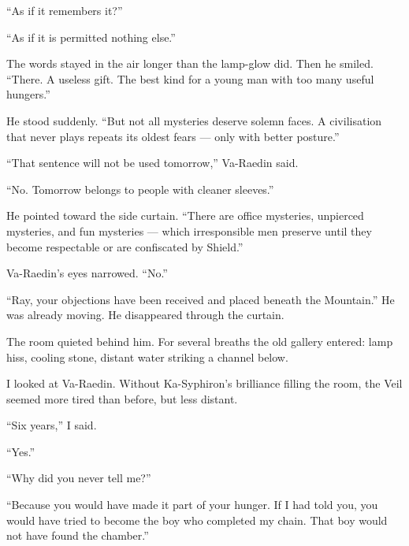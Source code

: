 ``As if it remembers it?''\par

``As if it is permitted nothing else.''\par

The words stayed in the air longer than the lamp-glow did. Then he smiled.
``There. A useless gift. The best kind for a young man with too many useful hungers.''\par

He stood suddenly. ``But not all mysteries deserve solemn faces. A civilisation that never plays repeats its oldest fears --- only with better posture.''\par

``That sentence will not be used tomorrow,'' Va-Raedin said.\par

``No. Tomorrow belongs to people with cleaner sleeves.''\par

He pointed toward the side curtain. ``There are office mysteries, unpierced mysteries, and fun mysteries --- which irresponsible men preserve until they become respectable or are confiscated by Shield.''\par

Va-Raedin's eyes narrowed. ``No.''\par

``Ray, your objections have been received and placed beneath the Mountain.'' He was already moving. He disappeared through the curtain.\par

The room quieted behind him. For several breaths the old gallery entered: lamp hiss, cooling stone, distant water striking a channel below.\par

I looked at Va-Raedin. Without Ka-Syphiron's brilliance filling the room, the Veil seemed more tired than before, but less distant.\par

``Six years,'' I said.\par

``Yes.''\par

``Why did you never tell me?''\par

``Because you would have made it part of your hunger. If I had told you, you would have tried to become the boy who completed my chain. That boy would not have found the chamber.''\par

